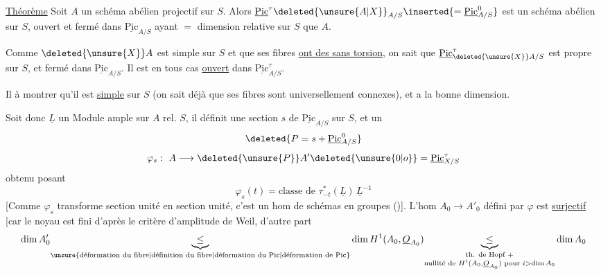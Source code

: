 \uline{Théorème} Soit $A$ un schéma abélien projectif sur $S$. Alors $\underline{\mathrm{Pic}}^{\tau}\deleted{\unsure{A|X}}_{A/S}\inserted{=\underline{\mathrm{Pic}}^{0}_{A/S}}$ est un schéma abélien sur $S$, ouvert et fermé dans $\underline{\mathrm{Pic}}_{A/S}$ ayant $=$ dimension relative sur $S$ que $A$.

Comme $\deleted{\unsure{X}}A$ est simple sur $S$ et que ses fibres \uline{ont des  sans torsion}, on sait que $\underline{\mathrm{Pic}}^{\tau}_{\deleted{\unsure{X}}A/S}$ est propre sur $S$, et fermé dans $\underline{\mathrm{Pic}}_{A/S}$. Il est en tous cas \uline{ouvert} dans $\underline{\mathrm{Pic}}^{\tau}_{A/S}$.

Il  à montrer qu'il est \uline{simple} sur $S$ (on sait déjà que ses fibres sont universellement connexes), et a la bonne dimension.

Soit donc $\underline L$ un Module ample sur $A$ rel. $S$, il définit une section $s$ de $\underline{\mathrm{Pic}}_{A/S}$ sur $S$, et un 
\[
\deleted{P=s+\underline{\mathrm{Pic}}^{0}_{A/S}}
\]
\[
\varphi_s:\ A\longrightarrow \deleted{\unsure{P}}A'\deleted{\unsure{0|o}}=\underline{\mathrm{Pic}}^\tau_{X/S}
\]
obtenu posant
\[
\varphi_s(t)=\text{classe de }\tau_{-t}^{*}(\underline L)\,\underline L^{-1}
\]
[Comme $\varphi_s$ transforme section unité en section unité, c'est un hom de schémas en groupes ()].  L'hom $A_0\to A'_0$ défini par $\varphi$ est \uline{surjectif} [car le noyau est fini d'après le critère d'amplitude de Weil, d'autre part
\[
\dim A'_0\underset{\text{\unsure{déformation du fibre|définition du fibre|déformation du Pic|déformation de Pic}}}{\underbrace{\leq}} \dim H^1(A_0,\underline O_{A_0})
\underset{\substack{\text{th. de Hopf }+\\ \text{nullité de }H^i(A_0,\underline O_{A_0})\text{ pour }i>\dim A_0}}{\underbrace{\leq}}\dim A_0
\]

